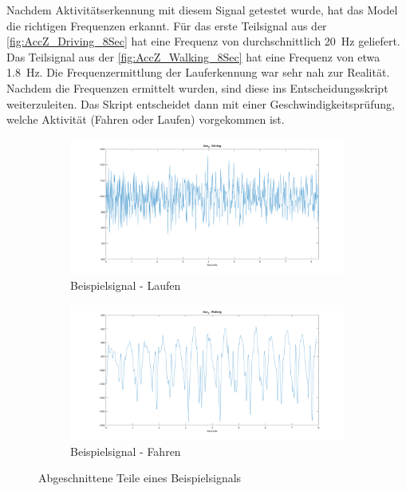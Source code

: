 Nachdem Aktivitätserkennung mit diesem Signal getestet wurde, hat das Model die richtigen Frequenzen erkannt.
Für das erste Teilsignal aus der \autoref{fig:AccZ_Driving_8Sec} hat eine Frequenz von durchschnittlich \SI{20}{\hertz} geliefert. Das Teilsignal aus der \autoref{fig:AccZ_Walking_8Sec} hat eine Frequenz von etwa \SI{1,8}{\hertz}. Die Frequenzermittlung der Lauferkennung war sehr nah zur Realität.
Nachdem die Frequenzen ermittelt wurden, sind diese ins Entscheidungsskript weiterzuleiten. Das Skript entscheidet dann mit einer Geschwindigkeitsprüfung, welche Aktivität (Fahren oder Laufen) vorgekommen ist.


\begin{figure}
	\centering
	\begin{subfigure}{\textwidth} %
		\centering
		\includegraphics[width=\textwidth]{Bilder/AccZ_Driving_8Sec.png}
		\caption{Beispielsignal - Laufen}
		\label{fig:AccZ_Driving_8Sec}
	\end{subfigure}
	\hfill
	\begin{subfigure}{\textwidth}
		\centering
		\includegraphics[width=\textwidth]{Bilder/AccZ_Walking_8Sec.png}
		\caption{Beispielsignal - Fahren}
		\label{fig:AccZ_Walking_8Sec}
	\end{subfigure}
	\caption{Abgeschnittene Teile eines Beispielsignals}
	\label{fig:AbschnitteBeispielsignal}
\end{figure}



